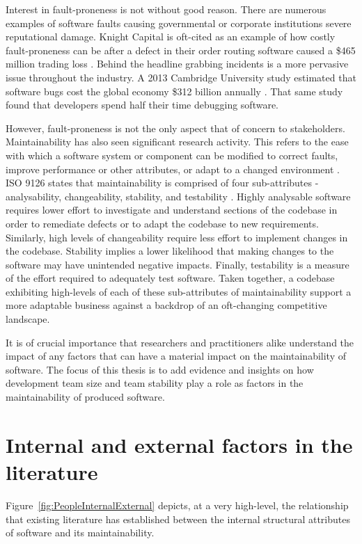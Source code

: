 Interest in fault-proneness is not without good reason. There are numerous examples of software faults causing governmental or corporate institutions severe reputational damage. Knight Capital is oft-cited as an example of how costly fault-proneness can be after a defect in their order routing software caused a \$465 million trading loss \citep{sec2013}. Behind the headline grabbing incidents is a more pervasive issue throughout the industry. A 2013 Cambridge University study estimated that software bugs cost the global economy \$312 billion annually \citep{britton2013reversible}. That same study found that developers spend half their time debugging software.

However, fault-proneness is not the only aspect that of concern to stakeholders. Maintainability has also seen significant research activity. This refers to the ease with which a software system or component can be modified to correct faults, improve performance or other attributes, or adapt to a changed environment \citep{radatz1990ieee}. ISO 9126 states that maintainability is comprised of four sub-attributes - analysability, changeability, stability, and testability \citep{ISO9126}. Highly analysable software requires lower effort to investigate and understand sections of the codebase in order to remediate defects or to adapt the codebase to new requirements. Similarly, high levels of changeability require less effort to implement changes in the codebase. Stability implies a lower likelihood that making changes to the software may have unintended negative impacts. Finally, testability is a measure of the effort required to adequately test software. Taken together, a codebase exhibiting high-levels of each of these sub-attributes of maintainability support a more adaptable business against a backdrop of an oft-changing competitive landscape. 

It is of crucial importance that researchers and practitioners alike understand the impact of any factors that can have a material impact on the maintainability of software. The focus of this thesis is to add evidence and insights on how development team size and team stability play a role as factors in the maintainability of produced software.

\section{Internal and external factors in the literature} %
Figure~\ref{fig:PeopleInternalExternal} depicts, at a very high-level, the relationship that existing literature has established between the internal structural attributes of software and its maintainability.

